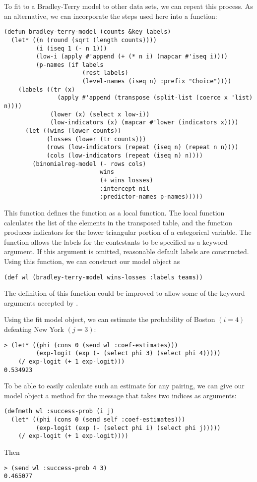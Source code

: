 To fit to a Bradley-Terry model to other data sets, we can repeat this
process.  As an alternative, we can incorporate the steps used here
into a function:
\begin{verbatim}
(defun bradley-terry-model (counts &key labels)
  (let* ((n (round (sqrt (length counts))))
         (i (iseq 1 (- n 1)))
         (low-i (apply #'append (+ (* n i) (mapcar #'iseq i))))
         (p-names (if labels
                      (rest labels) 
                      (level-names (iseq n) :prefix "Choice"))))
    (labels ((tr (x)
               (apply #'append (transpose (split-list (coerce x 'list) n))))
             (lower (x) (select x low-i))
             (low-indicators (x) (mapcar #'lower (indicators x))))
      (let ((wins (lower counts))
            (losses (lower (tr counts)))
            (rows (low-indicators (repeat (iseq n) (repeat n n))))
            (cols (low-indicators (repeat (iseq n) n))))
        (binomialreg-model (- rows cols)
                           wins 
                           (+ wins losses)
                           :intercept nil
                           :predictor-names p-names)))))
\end{verbatim}
This function defines the function  as a local function.
The local function  calculates the list of the elements in
the transposed table, and the function  produces
indicators for the lower triangular portion of a categorical variable.
The  function allows the labels for the
contestants to be specified as a keyword argument. If this argument is
omitted, reasonable default labels are constructed. Using this
function, we can construct our model object as
\begin{verbatim}
(def wl (bradley-terry-model wins-losses :labels teams))
\end{verbatim}

The definition of this function could be improved to allow some of the
keyword arguments accepted by .

Using the fit model object, we can estimate the probability of Boston
$(i = 4)$ defeating New York $(j = 3)$:
\begin{verbatim}
> (let* ((phi (cons 0 (send wl :coef-estimates)))
         (exp-logit (exp (- (select phi 3) (select phi 4)))))
    (/ exp-logit (+ 1 exp-logit)))
0.534923
\end{verbatim}
To be able to easily calculate such an estimate for any pairing, we can
give our model object a method for the  message
that takes two indices as arguments:
\begin{verbatim}
(defmeth wl :success-prob (i j)
  (let* ((phi (cons 0 (send self :coef-estimates)))
         (exp-logit (exp (- (select phi i) (select phi j)))))
    (/ exp-logit (+ 1 exp-logit))))
\end{verbatim}
Then
\begin{verbatim}
> (send wl :success-prob 4 3)
0.465077
\end{verbatim}

